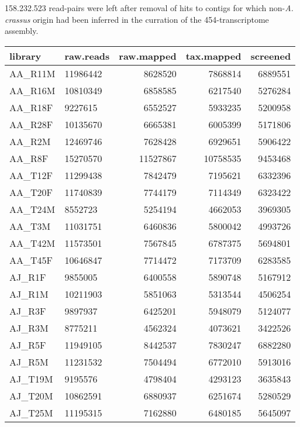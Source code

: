 158.232.523 read-pairs were left after removal of hits to contigs for
which non-\textit{A. crassus} origin had been inferred in the
curration of the 454-transcriptome assembly.

\begin{table}[h]
\begin{center}
\begin{tabular}{llrrr}
  \hline
library & raw.reads & raw.mapped & tax.mapped & screened \\ 
  \hline
AA\_R11M & 11986442 & 8628520 & 7868814 & 6889551 \\ 
  AA\_R16M & 10810349 & 6858585 & 6217540 & 5276284 \\ 
  AA\_R18F & 9227615 & 6552527 & 5933235 & 5200958 \\ 
  AA\_R28F & 10135670 & 6665381 & 6005399 & 5171806 \\ 
  AA\_R2M & 12469746 & 7628428 & 6929651 & 5906422 \\ 
  AA\_R8F & 15270570 & 11527867 & 10758535 & 9453468 \\ 
  AA\_T12F & 11299438 & 7842479 & 7195621 & 6332396 \\ 
  AA\_T20F & 11740839 & 7744179 & 7114349 & 6323422 \\ 
  AA\_T24M & 8552723 & 5254194 & 4662053 & 3969305 \\ 
  AA\_T3M & 11031751 & 6460836 & 5800042 & 4993726 \\ 
  AA\_T42M & 11573501 & 7567845 & 6787375 & 5694801 \\ 
  AA\_T45F & 10646847 & 7714472 & 7173709 & 6283585 \\ 
  AJ\_R1F & 9855005 & 6400558 & 5890748 & 5167912 \\ 
  AJ\_R1M & 10211903 & 5851063 & 5313544 & 4506254 \\ 
  AJ\_R3F & 9897937 & 6425201 & 5948079 & 5124077 \\ 
  AJ\_R3M & 8775211 & 4562324 & 4073621 & 3422526 \\ 
  AJ\_R5F & 11949105 & 8442537 & 7830247 & 6882280 \\ 
  AJ\_R5M & 11231532 & 7504494 & 6772010 & 5913016 \\ 
  AJ\_T19M & 9195576 & 4798404 & 4293123 & 3635843 \\ 
  AJ\_T20M & 10862591 & 6880937 & 6251674 & 5280529 \\ 
  AJ\_T25M & 11195315 & 7162880 & 6480185 & 5645097 \\ 

\end{tabular}
\end{center}
\end{table}

